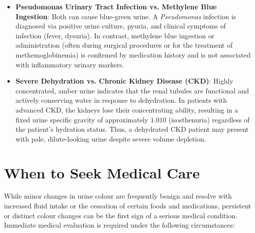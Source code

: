 \begin{itemize}
  \item \textbf{Pseudomonas Urinary Tract Infection vs. Methylene Blue Ingestion}: Both can cause blue-green urine. A \textit{Pseudomonas} infection is diagnosed via positive urine culture, pyuria, and clinical symptoms of infection (fever, dysuria). In contrast, methylene blue ingestion or administration (often during surgical procedures or for the treatment of methemoglobinemia) is confirmed by medication history and is not associated with inflammatory urinary markers.

  \item \textbf{Severe Dehydration vs. Chronic Kidney Disease (CKD)}: Highly concentrated, amber urine indicates that the renal tubules are functional and actively conserving water in response to dehydration. In patients with advanced CKD, the kidneys lose their concentrating ability, resulting in a fixed urine specific gravity of approximately $1.010$ (isosthenuria) regardless of the patient's hydration status. Thus, a dehydrated CKD patient may present with pale, dilute-looking urine despite severe volume depletion.
\end{itemize}

\section*{When to Seek Medical Care}
While minor changes in urine colour are frequently benign and resolve with increased fluid intake or the cessation of certain foods and medications, persistent or distinct colour changes can be the first sign of a serious medical condition. Immediate medical evaluation is required under the following circumstances:

